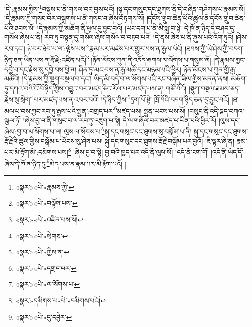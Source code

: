།དེ་:རྣམས་ཀྱིས་\footnote{«སྣར་»«པེ་»རྣམས་ཀྱི་}བསྡུས་པ་ནི་གསལ་བར་བྱས་པའོ། །སྐུ་དང་གསུང་དང་ཐུགས་ནི་དེ་བཞིན་གཤེགས་པ་རྣམས་སོ། །དེ་རྣམས་ཀྱི་གསང་བར་བསྒྲགས་པ་ནི་གསང་བ་ཞེས་བཏགས་སོ། །དངོས་གྲུབ་ཆེན་པོའི་ཚུལ་ནི་དངོས་གྲུབ་ཆེན་པོའི་ཐབས་སོ། །དེ་རྣམས་ཀྱི་མཆོག་ནི་ཕུལ་དུ་བྱུང་བའོ། །ཡང་དག་པ་ནི་མི་སླུ་བ་སྟེ། དེ་ཁོ་ན་ཉིད་དེ་བཤད་དུ་གསོལ་ཞེས་པ་ནི། རབ་ཏུ་བསྟན་དུ་གསོལ་ཞེས་གསོལ་བ་བཏབ་པའོ། །དེ་ནས་ཞེས་པ་ནི་ཞུས་པའི་འོག་ཏུའོ། །ཤེས་རབ་དང་། ཉེ་བར་ཐོབ་པ་ལ་:ལྟོས་པས་\footnote{«སྣར་»«པེ་»བལྟོས་པས་}རྣམ་པར་མཛེས་པར་གྱུར་པས་ན་རྒྱལ་པོའོ། །ཐབས་ཀྱི་ཡེ་ཤེས་ཀྱི་བདག་ཉིད་ཅན་ཡིན་པས་ན་རྡོ་རྗེ་:འཛིན་པའོ།\footnote{«སྣར་»«པེ་»འཛིན་པས་སོ།} །ཉོན་མོངས་ཀུན་ནི་འདོད་ཆགས་ལ་སོགས་པ་གསུམ་མོ། །དེ་རྣམས་ཀྱང་དབྱེ་བ་དང་རྗེས་སུ་དབྱེ་བས་ཕྱེ་ན། ཤིན་ཏུ་མང་བས་ན་རྒྱ་མཚོ་དང་མཉམ་པའི་ཕྱིར། ཉོན་མོངས་པ་ཀུན་གྱི་རྒྱ་མཚོའོ། །དེ་རྣམས་ཀྱི་སྡུག་བསྔལ་བ་དང་། ཡིད་མི་བདེ་བ་ལ་སོགས་པའི་རང་བཞིན་ཟིལ་གྱིས་མནན་ནས། མཆོག་ཏུ་དགའ་བའི་ངོ་བོ་ཉིད་ཀྱིས་འབྱུང་བར་མཛད་ཅིང་རོལ་པར་མཛད་པས་ན། གཙོ་བོའོ། །སྡུག་བསྔལ་ཐམས་ཅད་རྗེས་སུ་སྲེག་\footnote{«སྣར་»«པེ་»སྲེགས་}པར་མཛད་པས་ན་འབར་བའོ། །དེ་ཉིད་ཀྱིས་\footnote{«སྣར་»«པེ་»ཀྱིས་ན་}དྲག་པོ་སྟེ། ཁྲོ་བོའི་བདག་ཉིད་ཅན་དུ་བྱུང་བའོ། །ཐ་མལ་པ་བས་ཀྱང་རབ་ཏུ་རྒྱས་པའི་སྤྱན་:བགྲད་པར་\footnote{«སྣར་»«པེ་»དགྲད་པར་}མཛད་པས། སྤྱན་ཡངས་པས་སོ། །གསུང་ནི་འདི་སྐད་བཀའ་སྩལ་ཏོ། །ཞེས་བྱ་བ་ནི་གསུང་བ་ལ་རབ་ཏུ་འཇུག་པ་སྟེ། དེ་ལ་གཞོལ་བར་མཛད་པ་ཡིན་པའི་ཕྱིར་རོ། །ལུས་དང་ཞེས་:བྱ་བ་ལ་སོགས་པ་ལ། ལུས་ལ་སོགས་པ་\footnote{«སྣར་»«པེ་»ལ་སོགས་པ་}སྐུ་དང་གསུང་དང་ཐུགས་སུ་བསྒོམ་པ་ནི། སྐུ་དང་གསུང་དང་ཐུགས་རྡོ་རྗེའི་ཚུལ་གྱིས་བསྒོམ་པ་ཡོངས་སུ་ཤེས་པས། སྐུ་དང་གསུང་དང་ཐུགས་རྡོ་རྗེ་བསྒོམ་པར་བྱའོ། །ཇི་ལྟར་ཞེ་ན། རྣམ་པར་མི་རྟོག་མི་:དམིགས་པས།\footnote{«སྣར་»དམིགས་པ«པེ་»དམིགས་པའོ།} །ཞེས་བྱ་བ་སྟེ། བྱ་བའི་ཁྱད་པར་འདི་ནི་ལུས་སོ། །འདི་ནི་ངག་གོ། །འདི་ནི་ཡིད་དོ་ཞེས་དེ་ཁོ་ན་ཉིད་དུ་\footnote{«སྣར་»«པེ་»དུ་དབྱེར་}མེད་པས་ན་རྣམ་པར་མི་རྟོག་པའོ། །
